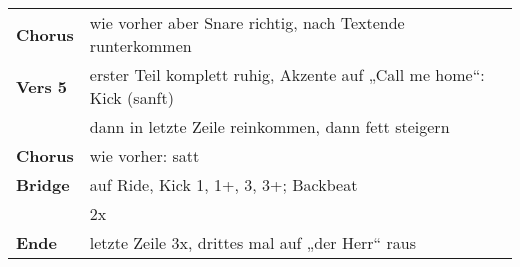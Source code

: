 \begin{tabular}{p{1.6cm}l}
	\textbf{Chorus} & wie vorher aber Snare richtig, nach Textende runterkommen            \\
	\textbf{Vers 5} & erster Teil komplett ruhig, Akzente auf „Call me home“: Kick (sanft) \\
	                & dann in letzte Zeile reinkommen, dann fett steigern                  \\
	\textbf{Chorus} & wie vorher: satt                                                     \\
	\textbf{Bridge} & auf Ride, Kick 1, 1+, 3, 3+; Backbeat                                \\
	                & 2x                                                                   \\
	\textbf{Ende}   & letzte Zeile 3x, drittes mal auf „der Herr“ raus                     \\
\end{tabular}
